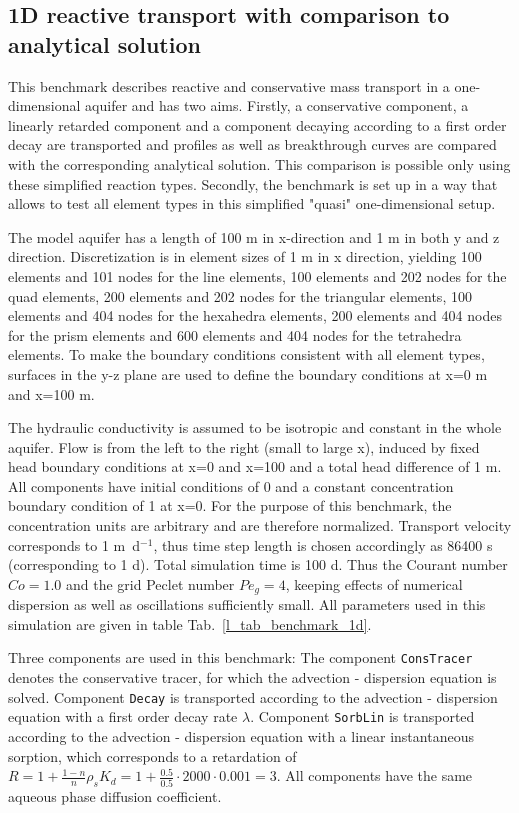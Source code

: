 


\subsection[1D reactive transport]{1D reactive transport with comparison to analytical solution}
\label{l_s_benchmark_1d}

This benchmark describes reactive and conservative mass transport in a one-dimensional aquifer and has two aims. Firstly, a conservative component, a linearly retarded component and a component decaying according to a first order decay are transported and profiles as well as breakthrough curves are compared with the corresponding analytical solution. This comparison is possible only using these simplified reaction types. Secondly, the benchmark is set up in a way that allows to test all element types in this simplified "quasi" one-dimensional setup.

The model aquifer has a length of 100 m in x-direction and 1 m in both y and z direction. Discretization is in element sizes of 1 m in x direction, yielding 100 elements and 101 nodes for the line elements, 100 elements and 202 nodes for the quad elements, 200 elements and 202 nodes for the triangular elements, 100 elements and 404 nodes for the hexahedra elements, 200 elements and 404 nodes for the prism elements and 600 elements and 404 nodes for the tetrahedra elements. To make the boundary conditions consistent with all element types, surfaces in the y-z plane are used to define the boundary conditions at x=0 m and x=100 m.

 The hydraulic conductivity is assumed to be isotropic and constant in the whole aquifer. Flow is from the left to the right (small to large x), induced by fixed head boundary conditions at x=0 and x=100 and a total head difference of 1 m. All components have initial conditions of 0 and a constant concentration boundary condition of 1 at x=0. For the purpose of this benchmark, the concentration units are arbitrary and are therefore normalized. Transport velocity corresponds to 1 m~d$^{-1}$, thus time step length is chosen accordingly as 86400 s (corresponding to 1 d). Total simulation time is 100 d. Thus the Courant number $Co = 1.0$ and the grid Peclet number $Pe_g = 4$, keeping effects of numerical dispersion as well as oscillations sufficiently small.
 All parameters used in this simulation are given in table Tab.~\ref{l_tab_benchmark_1d}.

Three components are used in this benchmark: The component \texttt{ConsTracer} denotes the conservative tracer, for which the advection - dispersion equation is solved. Component \texttt{Decay} is transported according to the advection - dispersion equation with a first order decay rate $\lambda$. Component \texttt{SorbLin} is transported according to the advection - dispersion equation with a linear instantaneous sorption, which corresponds to a retardation of $R = 1 + \frac{1-n}{n} \rho_s K_d = 1 + \frac{0.5}{0.5} \cdot 2000 \cdot0.001 = 3$. All components have the same aqueous phase diffusion coefficient.

